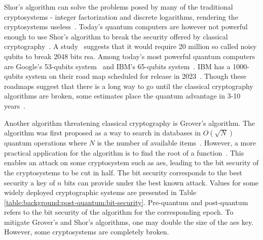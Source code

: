 Shor's algorithm can solve the problems posed by many of the traditional cryptosystems - integer factorization and discrete logarithms, rendering the cryptosystems useless~\cite{shor1997}. Today's quantum computers are however not powerful enough to use Shor's algorithm to break the security offered by classical cryptography~\cite{bernstein2017}. A study~\cite{gidney2019} suggests that it would require 20 million so called noisy \glspl{qubit} to break 2048 bits \gls{rsa}. Among today's most powerful quantum computers are Google's 53-\glspl{qubit} system~\cite{google2019:quantum-computer} and IBM's 65-\glspl{qubit} system~\cite{ibm2020:quantum-computer}. IBM has a 1000-\glspl{qubit} system on their road map scheduled for release in 2023~\cite{ibm2020:quantum-computer}. Though these roadmaps suggest that there is a long way to go until the classical cryptography algorithms are broken, some estimates place the quantum advantage in 3-10 years~\cite{ibm:z15:2019, microsoft2020}.

Another algorithm threatening classical cryptography is Grover's algorithm. The algorithm was first proposed as a way to search in databases in $O(\sqrt N)$ quantum operations where $N$ is the number of available items~\cite{grover1996}. However, a more practical application for the algorithm is to find the root of a function~\cite{bernstein2017}. This enables an attack on some cryptosystem such as \gls{aes}, leading to the bit security of the cryptosystems to be cut in half. The bit security corresponds to the best security a key of $n$ bits can provide under the best known attack. Values for some widely deployed cryptographic systems are presented in Table \ref{table:background:post-quantum:bit-security}. Pre-quantum and post-quantum refers to the bit security of the algorithm for the corresponding epoch. To mitigate Grover's and Shor's algorithms, one may double the size of the \gls{aes} key. However, some cryptosystems are completely broken.

